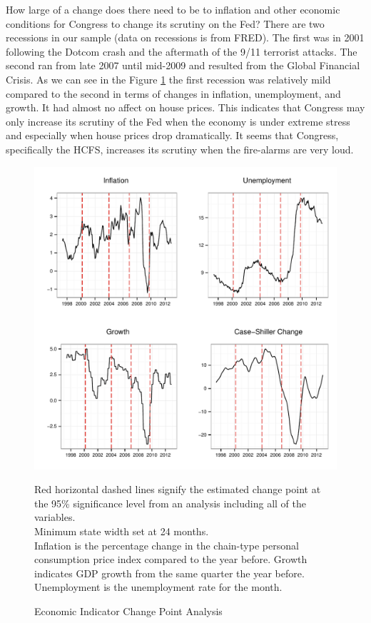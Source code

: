 \documentclass[a4paper]{article}\usepackage[]{graphicx}\usepackage[]{color}
\newenvironment{knitrout}{}{} %
\begin{document}
How large of a change does there need to be to inflation and other economic conditions for Congress to change its scrutiny on the Fed? There are two recessions in our sample (data on recessions is from FRED). The first was in 2001 following the Dotcom crash and the aftermath of the 9/11 terrorist attacks. The second ran from late 2007 until mid-2009 and resulted from the Global Financial Crisis. As we can see in the Figure \ref{fig:FullEconCP} the first recession was relatively mild compared to the second in terms of changes in inflation, unemployment, and growth. It had almost no affect on house prices. This indicates that Congress may only increase its scrutiny of the Fed when the economy is under extreme stress and especially when house prices drop dramatically. It seems that Congress, specifically the HCFS, increases its scrutiny when the fire-alarms are very loud.

\begin{figure}
    \caption{Economic Indicator Change Point Analysis}
    \label{fig:FullEconCP}
\begin{knitrout}
\color{fgcolor}

{\centering \includegraphics[width=0.8\linewidth]{figure/EconFullCP} 

}



\end{knitrout}
{\scriptsize{Red horizontal dashed lines signify the estimated change point at the 95\% significance level from an analysis including all of the variables.\\
Minimum state width set at 24 months. \\
Inflation is the percentage change in the chain-type personal consumption price index compared to the year before. Growth indicates GDP growth from the same quarter the year before. Unemployment is the unemployment rate for the month.}}
\end{figure}
\end{document}
